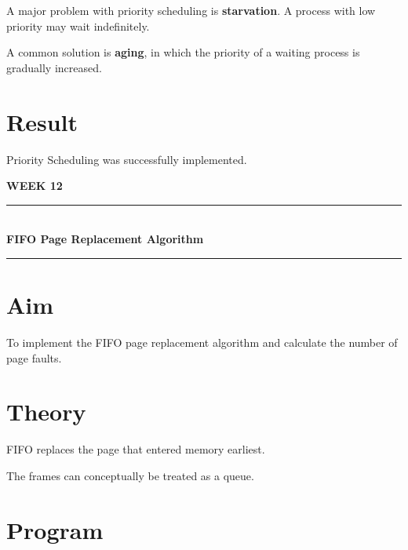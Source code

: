 \documentclass[12pt,a4paper]{report}
\newcommand{\experimenttitle}[2]{
\clearpage
\begin{center}
{\Large\bfseries\color{univblue} WEEK #1}\\[0.15cm]
\rule{\textwidth}{1pt}\\[0.2cm]
{\LARGE\bfseries #2}\\[0.2cm]
\rule{\textwidth}{1pt}
\end{center}
\vspace{0.4cm}
}
\begin{document}
A major problem with priority scheduling is \textbf{starvation}. A process with
low priority may wait indefinitely.

A common solution is \textbf{aging}, in which the priority of a waiting process
is gradually increased.

\section*{Result}

Priority Scheduling was successfully implemented.


\experimenttitle{12}{FIFO Page Replacement Algorithm}

\section*{Aim}

To implement the FIFO page replacement algorithm and calculate the number of
page faults.

\section*{Theory}

FIFO replaces the page that entered memory earliest.

The frames can conceptually be treated as a queue.

\section*{Program}
\end{document}
